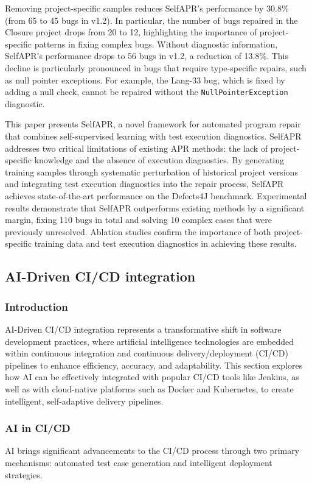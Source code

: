 \documentclass[manuscript,screen,review]{acmart}
\begin{document}
Removing project-specific samples reduces SelfAPR's performance by 30.8\% (from 65 to 45 bugs in v1.2). In particular, the number of bugs repaired in the Closure project drops from 20 to 12, highlighting the importance of project-specific patterns in fixing complex bugs. Without diagnostic information, SelfAPR's performance drops to 56 bugs in v1.2, a reduction of 13.8\%. This decline is particularly pronounced in bugs that require type-specific repairs, such as null pointer exceptions. For example, the Lang-33 bug, which is fixed by adding a null check, cannot be repaired without the \texttt{NullPointerException} diagnostic.

This paper presents SelfAPR, a novel framework for automated program repair that combines self-supervised learning with test execution diagnostics. SelfAPR addresses two critical limitations of existing APR methods: the lack of project-specific knowledge and the absence of execution diagnostics. By generating training samples through systematic perturbation of historical project versions and integrating test execution diagnostics into the repair process, SelfAPR achieves state-of-the-art performance on the Defects4J benchmark. Experimental results demonstrate that SelfAPR outperforms existing methods by a significant margin, fixing 110 bugs in total and solving 10 complex cases that were previously unresolved. Ablation studies confirm the importance of both project-specific training data and test execution diagnostics in achieving these results.

\subsection{AI-Driven CI/CD integration}

\subsubsection*{Introduction}
AI-Driven CI/CD integration represents a transformative shift in software development practices, where artificial intelligence technologies are embedded within continuous integration and continuous delivery/deployment (CI/CD) pipelines to enhance efficiency, accuracy, and adaptability. This section explores how AI can be effectively integrated with popular CI/CD tools like Jenkins, as well as with cloud-native platforms such as Docker and Kubernetes, to create intelligent, self-adaptive delivery pipelines.

\subsubsection*{AI in CI/CD}
AI brings significant advancements to the CI/CD process through two primary mechanisms: automated test case generation and intelligent deployment strategies.
\end{document}
